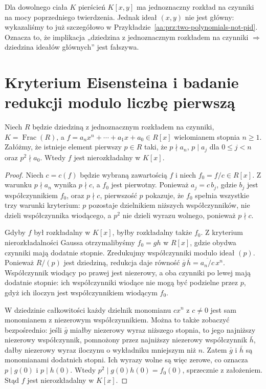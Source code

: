 \begin{przyklad}
\label{aa:prz:ufd-not-pid}
Dla dowolnego ciała $K$ pierścień $K[x,y]$ ma
jednoznaczny rozkład na czynniki na mocy poprzedniego
twierdzenia. Jednak ideał $(x,y)$ nie jest główny:
wykazaliśmy to już szczegółowo w
Przykładzie~\ref{aa:prz:two-polynomials-not-pid}.
Oznacza to, że implikacja
„dziedzina z jednoznacznym rozkładem na czynniki
$\Rightarrow$ dziedzina ideałów głównych” jest fałszywa.
\end{przyklad}

\section{Kryterium Eisensteina i badanie redukcji modulo liczbę pierwszą}
\begin{twierdzenie}
\label{aa:tw:eisenstein}
Niech $R$ będzie dziedziną z jednoznacznym rozkładem
na czynniki, $K=\operatorname{Frac}(R)$, a
$f=a_nx^n+\cdots+a_1x+a_0\in R[x]$ wielomianem
stopnia $n\ge1$. Załóżmy, że istnieje element pierwszy
$p\in R$ taki, że $p\nmid a_n$, $p\mid a_j$ dla
$0\le j<n$ oraz $p^2\nmid a_0$.
Wtedy $f$ jest nierozkładalny w $K[x]$.
\end{twierdzenie}
\begin{proof}
Niech $c=c(f)$ będzie wybraną zawartością $f$
i niech $f_0=f/c\in R[x]$. Z warunku
$p\nmid a_n$ wynika $p\nmid c$, a $f_0$ jest pierwotny.
Ponieważ $a_j=c\,b_j$, gdzie $b_j$ jest współczynnikiem
$f_0$, oraz $p\nmid c$, pierwszość $p$ pokazuje,
że $f_0$ spełnia wszystkie trzy warunki kryterium:
$p$ pozostaje dzielnikiem niższych współczynników,
nie dzieli współczynnika wiodącego, a $p^2$ nie dzieli
wyrazu wolnego, ponieważ $p\nmid c$.

Gdyby $f$ był rozkładalny w $K[x]$, byłby rozkładalny
także $f_0$. Z kryterium nierozkładalności Gaussa
otrzymalibyśmy $f_0=gh$ w $R[x]$, gdzie obydwa czynniki
mają dodatnie stopnie. Zredukujmy współczynniki modulo
ideał $(p)$. Ponieważ $R/(p)$ jest dziedziną,
redukcja daje równość
$\overline g\,\overline h=\overline{a_n/c}\,x^n$.
Współczynnik wiodący po prawej jest niezerowy,
a oba czynniki po lewej mają dodatnie stopnie:
ich współczynniki wiodące nie mogą być podzielne przez
$p$, gdyż ich iloczyn jest współczynnikiem wiodącym $f_0$.

W dziedzinie całkowitości każdy dzielnik monomianu
$c x^n$ z $c\ne0$ jest sam monomianem z niezerowym
współczynnikiem. Można to także zobaczyć bezpośrednio:
jeśli $\bar g$ miałby niezerowy wyraz niższego stopnia,
to jego najniższy niezerowy współczynnik, pomnożony
przez najniższy niezerowy współczynnik $\bar h$,
dałby niezerowy wyraz iloczynu o wykładniku mniejszym
niż $n$. Zatem $\bar g$ i $\bar h$ są monomianami
dodatnich stopni. Ich wyrazy wolne są więc zerowe,
co oznacza $p\mid g(0)$ i $p\mid h(0)$. Wtedy
$p^2\mid g(0)h(0)=f_0(0)$, sprzecznie z założeniem.
Stąd $f$ jest nierozkładalny w $K[x]$.
\end{proof}

